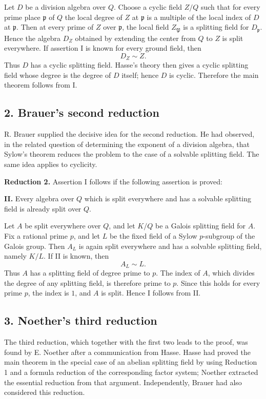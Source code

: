 \documentclass[11pt]{article}
\begin{document}
Let \(D\) be a division algebra over \(Q\). Choose a cyclic field
\(Z/Q\) such that for every prime place \(\mathfrak p\) of \(Q\) the
local degree of \(Z\) at \(\mathfrak p\) is a multiple of the local
index of \(D\) at \(\mathfrak p\). Then at every prime of \(Z\) over
\(\mathfrak p\), the local field \(Z_{\mathfrak P}\) is a splitting
field for \(D_{\mathfrak p}\). Hence the algebra \(D_Z\) obtained by
extending the center from \(Q\) to \(Z\) is split everywhere. If
assertion I is known for every ground field, then \[
  D_Z\sim Z.
\] Thus \(D\) has a cyclic splitting field. Hasse's theory then gives a
cyclic splitting field whose degree is the degree of \(D\) itself; hence
\(D\) is cyclic. Therefore the main theorem follows from I.

\subsection{2. Brauer's second
reduction}\label{brauers-second-reduction}

R. Brauer supplied the decisive idea for the second reduction. He had
observed, in the related question of determining the exponent of a
division algebra, that Sylow's theorem reduces the problem to the case
of a solvable splitting field. The same idea applies to cyclicity.

\textbf{Reduction 2.} Assertion I follows if the following assertion is
proved:

\textbf{II.} Every algebra over \(Q\) which is split everywhere and has
a solvable splitting field is already split over \(Q\).

Let \(A\) be split everywhere over \(Q\), and let \(K/Q\) be a Galois
splitting field for \(A\). Fix a rational prime \(p\), and let \(L\) be
the fixed field of a Sylow \(p\)-subgroup of the Galois group. Then
\(A_L\) is again split everywhere and has a solvable splitting field,
namely \(K/L\). If II is known, then \[
  A_L\sim L.
\] Thus \(A\) has a splitting field of degree prime to \(p\). The index
of \(A\), which divides the degree of any splitting field, is therefore
prime to \(p\). Since this holds for every prime \(p\), the index is
\(1\), and \(A\) is split. Hence I follows from II.

\subsection{3. Noether's third
reduction}\label{noethers-third-reduction}

The third reduction, which together with the first two leads to the
proof, was found by E. Noether after a communication from Hasse. Hasse
had proved the main theorem in the special case of an abelian splitting
field by using Reduction 1 and a formula reduction of the corresponding
factor system; Noether extracted the essential reduction from that
argument. Independently, Brauer had also considered this reduction.
\end{document}
